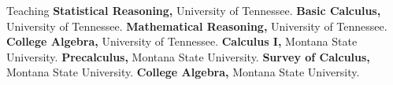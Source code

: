 \begin{rubric}{Teaching}
\entry*[M115] \textbf{Statistical Reasoning,} University of Tennessee.
\entry*[M125] \textbf{Basic Calculus,} University of Tennessee.
\entry*[M113] \textbf{Mathematical Reasoning,} University of Tennessee.
\entry*[M119] \textbf{College Algebra,} University of Tennessee.
\entry*[M171] \textbf{Calculus I,} Montana State University.
\entry*[M151] \textbf{Precalculus,} Montana State University.
\entry*[M161] \textbf{Survey of Calculus,} Montana State University.
\entry*[M121] \textbf{College Algebra,} Montana State University.
\end{rubric}

